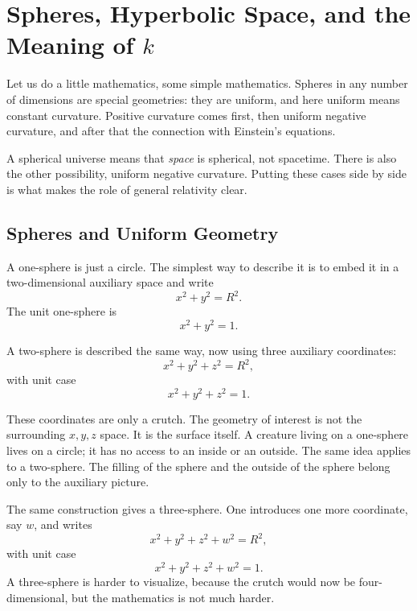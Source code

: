 \chapter{Spheres, Hyperbolic Space, and the Meaning of \(k\)}

Let us do a little mathematics, some simple mathematics. Spheres in any number of dimensions are special geometries: they are uniform, and here uniform means constant curvature. Positive curvature comes first, then uniform negative curvature, and after that the connection with Einstein's equations.

A spherical universe means that \emph{space} is spherical, not spacetime. There is also the other possibility, uniform negative curvature. Putting these cases side by side is what makes the role of general relativity clear.

\section{Spheres and Uniform Geometry}

A one-sphere is just a circle. The simplest way to describe it is to embed it in a two-dimensional auxiliary space and write
\begin{equation}
x^2+y^2=R^2.
\end{equation}
The unit one-sphere is
\begin{equation}
x^2+y^2=1.
\end{equation}

A two-sphere is described the same way, now using three auxiliary coordinates:
\begin{equation}
x^2+y^2+z^2=R^2,
\end{equation}
with unit case
\begin{equation}
x^2+y^2+z^2=1.
\end{equation}

These coordinates are only a crutch. The geometry of interest is not the surrounding \(x,y,z\) space. It is the surface itself. A creature living on a one-sphere lives on a circle; it has no access to an inside or an outside. The same idea applies to a two-sphere. The filling of the sphere and the outside of the sphere belong only to the auxiliary picture.

The same construction gives a three-sphere. One introduces one more coordinate, say \(w\), and writes
\begin{equation}
x^2+y^2+z^2+w^2=R^2,
\end{equation}
with unit case
\begin{equation}
x^2+y^2+z^2+w^2=1.
\end{equation}
A three-sphere is harder to visualize, because the crutch would now be four-dimensional, but the mathematics is not much harder.

